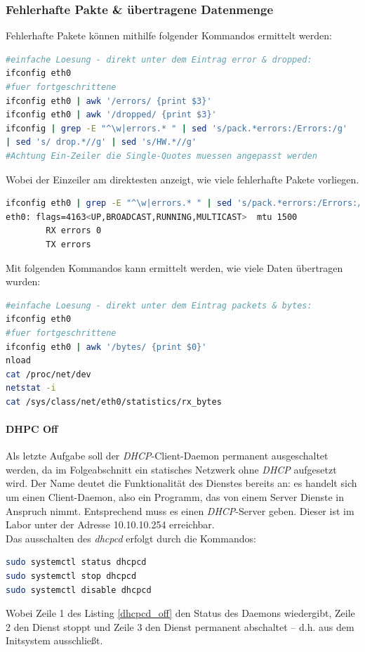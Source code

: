 \documentclass[paper=a4,fontsize=11pt]{scrartcl}%
\numberwithin{equation}{section}
\begin{document}
\subsubsection{Fehlerhafte Pakte \& übertragene Datenmenge} \label{pakete}
Fehlerhafte Pakete können mithilfe folgender Kommandos ermittelt werden:
\begin{lstlisting}[style=Bash, language=Bash]
#einfache Loesung - direkt unter dem Eintrag error & dropped:
ifconfig eth0 
#fuer fortgeschrittene
ifconfig eth0 | awk '/errors/ {print $3}'
ifconfig eth0 | awk '/dropped/ {print $3}'
ifconfig | grep -E "^\w|errors.* " | sed 's/pack.*errors:/Errors:/g'
| sed 's/ drop.*//g' | sed 's/HW.*//g'
#Achtung Ein-Zeiler die Single-Quotes muessen angepasst werden
\end{lstlisting}
Wobei der Einzeiler am direktesten anzeigt, wie viele fehlerhafte Pakete vorliegen.
\begin{lstlisting}[style=Bash, language=Bash]
ifconfig eth0 | grep -E "^\w|errors.* " | sed 's/pack.*errors:/Errors:/g' | sed 's/ drop.*//g' | sed 's/HW.*//g'
eth0: flags=4163<UP,BROADCAST,RUNNING,MULTICAST>  mtu 1500
        RX errors 0 
        TX errors
\end{lstlisting}
Mit folgenden Kommandos kann ermittelt werden, wie viele Daten übertragen wurden:
\begin{lstlisting}[style=Bash, language=Bash]
#einfache Loesung - direkt unter dem Eintrag packets & bytes:
ifconfig eth0 
#fuer fortgeschrittene
ifconfig eth0 | awk '/bytes/ {print $0}'
nload
cat /proc/net/dev
netstat -i
cat /sys/class/net/eth0/statistics/rx_bytes
\end{lstlisting}

\paragraph{DHPC Off}
Als letzte Aufgabe soll der \emph{DHCP}-Client-Daemon permanent ausgeschaltet werden, da im Folgeabschnitt ein statisches Netzwerk ohne \emph{DHCP} aufgesetzt wird. Der Name deutet die Funktionalität des Dienstes bereits an: es handelt sich um einen Client-Daemon, also ein Programm, das von einem Server Dienste in Anspruch nimmt. Entsprechend muss es einen \emph{DHCP}-Server geben. Dieser ist im Labor unter der Adresse 10.10.10.254 erreichbar.\\
Das ausschalten des \emph{dhcpcd} erfolgt durch die Kommandos:
\begin{lstlisting}[style=Bash, language=Bash, label=dhcpcd_off]
sudo systemctl status dhcpcd
sudo systemctl stop dhcpcd
sudo systemctl disable dhcpcd
\end{lstlisting}
Wobei Zeile 1 des Listing \ref{dhcpcd_off} den Status des Daemons wiedergibt, Zeile 2 den Dienst stoppt und Zeile 3 den Dienst permanent abschaltet -- d.h. aus dem Initsystem ausschließt.\\
\end{document}
